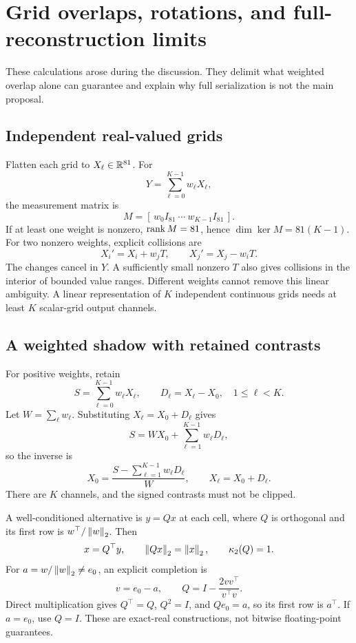 \section{Grid overlaps, rotations, and full-reconstruction limits}
\label{app:grids}

These calculations arose during the discussion. They delimit what weighted
overlap alone can guarantee and explain why full serialization is not the main
proposal.

\subsection{Independent real-valued grids}

Flatten each grid to \(X_\ell\in\mathbb R^{81}\). For
\[
 Y=\sum_{\ell=0}^{K-1}w_\ell X_\ell,
\]
the measurement matrix is
\[
 M=[\,w_0I_{81}\ \cdots\ w_{K-1}I_{81}\,].
\]
If at least one weight is nonzero, \(\operatorname{rank} M=81\), hence
\(\dim\ker M=81(K-1)\). For two nonzero weights, explicit collisions are
\[
 X_i'=X_i+w_jT,\qquad X_j'=X_j-w_iT.
\]
The changes cancel in \(Y\). A sufficiently small nonzero \(T\) also gives
collisions in the interior of bounded value ranges. Different weights cannot
remove this linear ambiguity. A linear representation of \(K\) independent
continuous grids needs at least \(K\) scalar-grid output channels.

\subsection{A weighted shadow with retained contrasts}

For positive weights, retain
\[
 S=\sum_{\ell=0}^{K-1}w_\ell X_\ell,\qquad
 D_\ell=X_\ell-X_0,\quad 1\le\ell<K.
\]
Let \(W=\sum_\ell w_\ell\). Substituting \(X_\ell=X_0+D_\ell\) gives
\[
 S=WX_0+\sum_{\ell=1}^{K-1}w_\ell D_\ell,
\]
so the inverse is
\[
 X_0=\frac{S-\sum_{\ell=1}^{K-1}w_\ell D_\ell}{W},
 \qquad X_\ell=X_0+D_\ell.
\]
There are \(K\) channels, and the signed contrasts must not be clipped.

A well-conditioned alternative is \(y=Qx\) at each cell, where \(Q\) is
orthogonal and its first row is \(w^\top/\left\lVert w\right\rVert_2\). Then
\[
 x=Q^\top y,\qquad \left\lVert Qx\right\rVert_2=\left\lVert x\right\rVert_2,\qquad \kappa_2(Q)=1.
\]
For \(a=w/\left\lVert w\right\rVert_2\ne e_0\), an explicit completion is
\[
 v=e_0-a,\qquad Q=I-\frac{2vv^\top}{v^\top v}.
\]
Direct multiplication gives \(Q^\top=Q\), \(Q^2=I\), and \(Qe_0=a\),
so its first row is \(a^\top\). If \(a=e_0\), use \(Q=I\).
These are exact-real constructions, not bitwise floating-point guarantees.

